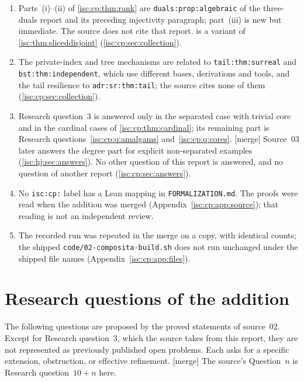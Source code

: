 \documentclass[11pt,letterpaper]{article}
\theoremstyle{definition}
\theoremstyle{remark}
\newcommand{\rpath}[1]{\nolinkurl{#1}}%
\newcommand{\lbl}[1]{\nolinkurl{#1}}%
\newcommand{\mtag}{\textup{[merge]}}%
\numberwithin{equation}{section}
\begin{document}
\begin{enumerate}[label=M\arabic*.,leftmargin=2.6em,itemsep=2pt]
\item Parts~(i)--(ii) of \cref{isc:cp:thm:rank} are
\lbl{duals:prop:algebraic} of the three-duals report and its preceding
injectivity paragraph; part~(iii) is new but immediate. The source does not
cite that report.  is a variant of
\cref{isc:thm:sliceddisjoint} (\cref{isc:cp:sec:collection}).
\item The private-index and tree mechanisms are related to
\lbl{tail:thm:surreal} and \lbl{bst:thm:independent}, which use different
bases, derivations and tools, and the tail resilience to
\lbl{adr:sr:thm:tail}; the source cites none of them
(\cref{isc:cp:sec:collection}).
\item Research question~3 is answered only in the separated case with
trivial core and in the cardinal cases of \cref{isc:cp:thm:cardinal}; its
remaining part is Research questions~\ref{isc:cp:q:amalgams}
and~\ref{isc:cp:q:cores}. \mtag{} Source~03 later answers the degree part
for explicit non-separated examples (\cref{isc:hj:sec:answers}). No other question of this report is answered, and
no question of another report (\cref{isc:cp:sec:answers}).
\item No \texttt{isc:cp:} label has a Lean mapping in
\rpath{FORMALIZATION.md}. The proofs were read when the addition was
merged (Appendix~\ref{isc:cp:app:source}); that reading is not an
independent review.
\item The recorded run was repeated in the merge on a copy, with identical
counts; the shipped \rpath{code/02-composita-build.sh} does not run
unchanged under the shipped file names (Appendix~\ref{isc:cp:app:files}).
\end{enumerate}

\section{Research questions of the addition}\label{isc:cp:sec:questions}

The following questions are proposed by the proved statements of
source~02. Except for Research question~3, which the source takes from this
report, they are not represented as previously published open problems.
Each asks for a specific extension, obstruction, or effective refinement.
\mtag{} The source's Question~$n$ is Research question~$10+n$ here.
\end{document}
